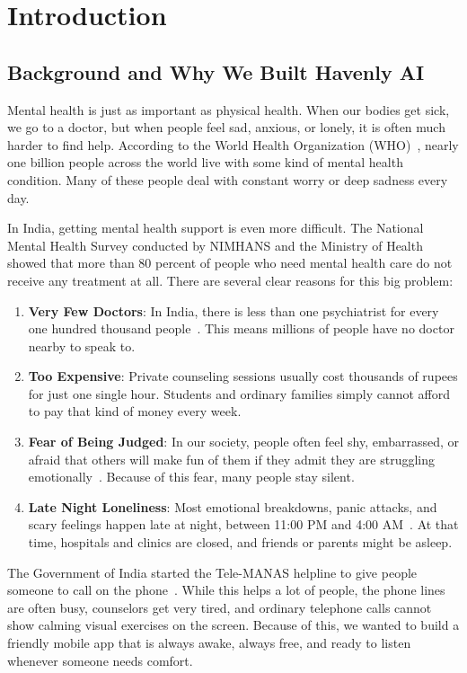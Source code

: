 \chapter{Introduction}
\label{chap:intro}

\section{Background and Why We Built Havenly AI}
\label{sec:intro_background}

Mental health is just as important as physical health. When our bodies get sick, we go to a doctor, but when people feel sad, anxious, or lonely, it is often much harder to find help. According to the World Health Organization (WHO)~\cite{who2022mentalhealth}, nearly one billion people across the world live with some kind of mental health condition. Many of these people deal with constant worry or deep sadness every day.

In India, getting mental health support is even more difficult. The National Mental Health Survey conducted by NIMHANS and the Ministry of Health~\cite{nimhans2016nmhs} showed that more than 80 percent of people who need mental health care do not receive any treatment at all. There are several clear reasons for this big problem:
\begin{enumerate}
    \item \textbf{Very Few Doctors}: In India, there is less than one psychiatrist for every one hundred thousand people~\cite{telemanas2022guidelines}. This means millions of people have no doctor nearby to speak to.
    \item \textbf{Too Expensive}: Private counseling sessions usually cost thousands of rupees for just one single hour. Students and ordinary families simply cannot afford to pay that kind of money every week.
    \item \textbf{Fear of Being Judged}: In our society, people often feel shy, embarrassed, or afraid that others will make fun of them if they admit they are struggling emotionally~\cite{apa2023stress}. Because of this fear, many people stay silent.
    \item \textbf{Late Night Loneliness}: Most emotional breakdowns, panic attacks, and scary feelings happen late at night, between 11:00 PM and 4:00 AM~\cite{samhsa2023report}. At that time, hospitals and clinics are closed, and friends or parents might be asleep.
\end{enumerate}

The Government of India started the Tele-MANAS helpline to give people someone to call on the phone~\cite{telemanas2022guidelines}. While this helps a lot of people, the phone lines are often busy, counselors get very tired, and ordinary telephone calls cannot show calming visual exercises on the screen. Because of this, we wanted to build a friendly mobile app that is always awake, always free, and ready to listen whenever someone needs comfort.

